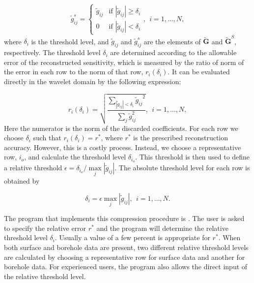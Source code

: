 \begin{equation}
\label{eq:elemg}
\widetilde{g}_{ij}^{s}=\begin{cases}
\widetilde{g}_{ij} & \mbox{if } \left|\widetilde{g}_{ij}\right| \geq \delta _i \\
0 & \mbox{if } \left|\widetilde{g}_{ij}\right| < \delta _i
\end{cases}, ~~ i=1,\ldots,N,
\end{equation}
%
where $\delta _i$ is the threshold level, and $\widetilde{g}_{ij}$ and $\widetilde{g}_{ij}^{s}$ are the elements of $\widetilde{\mathbf{G}}$ and	 $\widetilde{\mathbf{G}}^S$, respectively. The threshold level $\delta _i$ are determined according to the allowable error of the reconstructed sensitivity, which is measured by the ratio of norm of the error in each row to the norm of that row, $r_i(\delta_i)$. It can be evaluated directly in the wavelet domain by the following expression:

\begin{equation}
\label{eq:rhoi}
r_i(\delta_i)=\sqrt{\frac{\underset{\left | {\widetilde{g}_{ij}} \right |<\delta_i}\sum{\widetilde{g}_{ij}}^2}{\underset{j}\sum{\widetilde{g}_{ij}^2}}}, ~~i=1,\ldots,N,
\end{equation}
%
Here the numerator is the norm of the discarded coefficients. For each row we choose $\delta_i$ such that $r_i(\delta_i)=r^*$, where $r^*$ is the prescribed reconstruction accuracy. However, this is a costly process. Instead, we choose a representative row, $i_o$, and calculate the threshold level $\delta_{i_o}$. This threshold is then used to define a relative threshold $\epsilon =\delta_{i_{o}}/ \underset{j}{\max}\left | {\widetilde{g}_{ij}} \right |$. The absolute threshold level for each row is obtained by

\begin{equation}
\label{eq:deltai}
\delta_i = \epsilon \underset{j}{\max}\left | {\widetilde{g}_{ij}} \right|, ~~i=1,\ldots,N.
\end{equation}

The program that implements this compression procedure is . The user is asked to specify the relative error $r^*$ and the program will determine the relative threshold level $\delta_i$. Usually a value of a few percent is appropriate for $r^*$. When both surface and borehole data are present, two different relative threshold levels are calculated by choosing a representative row for surface data and another for borehole data. For experienced users, the program also allows the direct input of the relative threshold level.